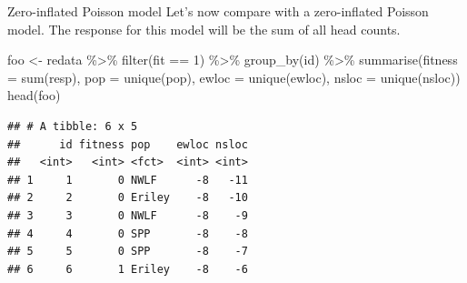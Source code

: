 \documentclass[
  ignorenonframetext,
]{beamer}
\newenvironment{Shaded}{\begin{snugshade}}{\end{snugshade}}
\newcommand{\AttributeTok}[1]{\textcolor[rgb]{0.77,0.63,0.00}{#1}}
\newcommand{\DecValTok}[1]{\textcolor[rgb]{0.00,0.00,0.81}{#1}}
\newcommand{\FunctionTok}[1]{\textcolor[rgb]{0.00,0.00,0.00}{#1}}
\newcommand{\NormalTok}[1]{#1}
\newcommand{\OtherTok}[1]{\textcolor[rgb]{0.56,0.35,0.01}{#1}}
\newcommand{\SpecialCharTok}[1]{\textcolor[rgb]{0.00,0.00,0.00}{#1}}
\begin{document}
\begin{frame}[fragile]{Zero-inflated Poisson model}
\protect\hypertarget{zero-inflated-poisson-model}{}
Let's now compare with a zero-inflated Poisson model. The response for
this model will be the sum of all head counts.

\vspace{12pt}
\tiny

\begin{Shaded}
\begin{Highlighting}[]
\NormalTok{foo }\OtherTok{\textless{}{-}}\NormalTok{ redata }\SpecialCharTok{\%\textgreater{}\%} \FunctionTok{filter}\NormalTok{(fit }\SpecialCharTok{==} \DecValTok{1}\NormalTok{) }\SpecialCharTok{\%\textgreater{}\%} \FunctionTok{group\_by}\NormalTok{(id) }\SpecialCharTok{\%\textgreater{}\%} 
  \FunctionTok{summarise}\NormalTok{(}\AttributeTok{fitness =} \FunctionTok{sum}\NormalTok{(resp), }\AttributeTok{pop =} \FunctionTok{unique}\NormalTok{(pop), }
            \AttributeTok{ewloc =} \FunctionTok{unique}\NormalTok{(ewloc), }\AttributeTok{nsloc =} \FunctionTok{unique}\NormalTok{(nsloc))}
\FunctionTok{head}\NormalTok{(foo)}
\end{Highlighting}
\end{Shaded}

\begin{verbatim}
## # A tibble: 6 x 5
##      id fitness pop    ewloc nsloc
##   <int>   <int> <fct>  <int> <int>
## 1     1       0 NWLF      -8   -11
## 2     2       0 Eriley    -8   -10
## 3     3       0 NWLF      -8    -9
## 4     4       0 SPP       -8    -8
## 5     5       0 SPP       -8    -7
## 6     6       1 Eriley    -8    -6
\end{verbatim}
\end{frame}
\end{document}
